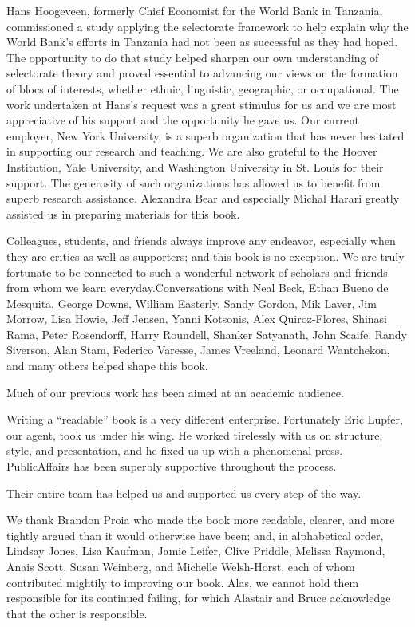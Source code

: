 \documentclass[10pt]{article}
\begin{document}
{\large Hans Hoogeveen, formerly Chief Economist for the World Bank in Tanzania,
commissioned a study applying the selectorate framework to help explain why the
World Bank's efforts in Tanzania had not been as successful as they had hoped.
The opportunity to do that study helped sharpen our own understanding of
selectorate theory and proved essential to advancing our views on the formation
of blocs of interests, whether ethnic, linguistic, geographic, or occupational.
The work undertaken at Hans's request was a great stimulus for us and we are most
appreciative of his support and the opportunity he gave us. Our current employer,
New York University, is a superb organization that has never hesitated in
supporting our research and teaching. We are also grateful to the Hoover
Institution, Yale University, and Washington University in St. Louis for their
support. The generosity of such organizations has allowed us to benefit from
superb research assistance. Alexandra Bear and especially Michal Harari greatly
assisted us in preparing materials for this book.}

{\large Colleagues, students, and friends always improve any endeavor,
especially when they are critics as well as supporters; and this book is no
exception. We are truly fortunate to be connected to such a wonderful network of
scholars and friends from whom we learn everyday.Conversations with Neal Beck,
Ethan Bueno de Mesquita, George Downs, William Easterly, Sandy Gordon, Mik Laver,
Jim Morrow, Lisa Howie, Jeff Jensen, Yanni Kotsonis, Alex Quiroz-Flores, Shinasi
Rama, Peter Rosendorff, Harry Roundell, Shanker Satyanath, John Scaife, Randy
Siverson, Alan Stam, Federico Varesse, James Vreeland, Leonard Wantchekon, and
many others helped shape this book.}

{\large Much of our previous work has been aimed at an academic audience.}

{\large Writing a ``readable'' book is a very different enterprise. Fortunately
Eric Lupfer, our agent, took us under his wing. He worked tirelessly with us on
structure, style, and presentation, and he fixed us up with a phenomenal press.
PublicAffairs has been superbly supportive throughout the process.}

{\large Their entire team has helped us and supported us every step of the way.}

{\large We thank Brandon Proia who made the book more readable, clearer, and
more tightly argued than it would otherwise have been; and, in alphabetical
order, Lindsay Jones, Lisa Kaufman, Jamie Leifer, Clive Priddle, Melissa Raymond,
Anais Scott, Susan Weinberg, and Michelle Welsh-Horst, each of whom contributed
mightily to improving our book. Alas, we cannot hold them responsible for its
continued failing, for which Alastair and Bruce acknowledge that the other is
responsible.}
\end{document}
